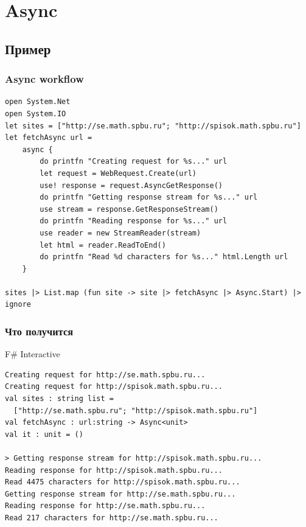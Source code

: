 \documentclass{../../slides-style}
\begin{document}
    \begin{frame}[plain]
        \titlepage
    \end{frame}

    \section{Async}

    \subsection{Пример}

    \begin{frame}[fragile]
        \frametitle{Async workflow}
        \begin{footnotesize}
            \begin{verbatim}
open System.Net
open System.IO
let sites = ["http://se.math.spbu.ru"; "http://spisok.math.spbu.ru"]
let fetchAsync url =
    async { 
        do printfn "Creating request for %s..." url
        let request = WebRequest.Create(url)
        use! response = request.AsyncGetResponse()
        do printfn "Getting response stream for %s..." url
        use stream = response.GetResponseStream()
        do printfn "Reading response for %s..." url
        use reader = new StreamReader(stream)
        let html = reader.ReadToEnd()
        do printfn "Read %d characters for %s..." html.Length url 
    }

sites |> List.map (fun site -> site |> fetchAsync |> Async.Start) |> ignore
            \end{verbatim}
        \end{footnotesize}
    \end{frame}

    \begin{frame}[fragile]
        \frametitle{Что получится}
        \begin{alertblock}{F\# Interactive}
            \begin{verbatim}
Creating request for http://se.math.spbu.ru...
Creating request for http://spisok.math.spbu.ru...
val sites : string list =
  ["http://se.math.spbu.ru"; "http://spisok.math.spbu.ru"]
val fetchAsync : url:string -> Async<unit>
val it : unit = ()

> Getting response stream for http://spisok.math.spbu.ru...
Reading response for http://spisok.math.spbu.ru...
Read 4475 characters for http://spisok.math.spbu.ru...
Getting response stream for http://se.math.spbu.ru...
Reading response for http://se.math.spbu.ru...
Read 217 characters for http://se.math.spbu.ru...
            \end{verbatim}
        \end{alertblock}
    \end{frame}
\end{document}
